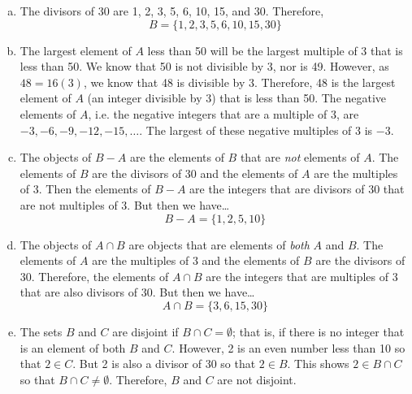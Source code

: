 \documentclass[11pt,letterpaper]{article}
\begin{document}
\sol 
\begin{enumerate}[(a)]
\item The divisors of 30 are 1, 2, 3, 5, 6, 10, 15, and 30. Therefore, 
	\[
	B= \{ 1, 2, 3, 5, 6, 10, 15, 30 \}
	\] \pspace

\item The largest element of $A$ less than 50 will be the largest multiple of 3 that is less than 50. We know that 50 is not divisible by 3, nor is 49. However, as $48= 16(3)$, we know that 48 is divisible by 3. Therefore, 48 is the largest element of $A$ (an integer divisible by 3) that is less than 50. The negative elements of $A$, i.e. the negative integers that are a multiple of 3, are $-3, -6, -9, -12, -15, \ldots$. The largest of these negative multiples of 3 is $-3$. \pspace

\item The objects of $B - A$ are the elements of $B$ that are \textit{not} elements of $A$. The elements of $B$ are the divisors of 30 and the elements of $A$ are the multiples of 3. Then the elements of $B - A$ are the integers that are divisors of 30 that are not multiples of 3. But then we have\dots
	\[
	B - A= \{ 1, 2, 5, 10 \}
	\]


\item The objects of $A \cap B$ are objects that are elements of \textit{both} $A$ and $B$. The elements of $A$ are the multiples of 3 and the elements of $B$ are the divisors of 30. Therefore, the elements of $A \cap B$ are the integers that are multiples of 3 that are also divisors of 30. But then we have\dots
	\[
	A \cap B=  \{ 3, 6, 15, 30 \}
	\] \pspace

\item The sets $B$ and $C$ are disjoint if $B \cap C= \emptyset$; that is, if there is no integer that is an element of both $B$ and $C$. However, 2 is an even number less than 10 so that $2 \in C$. But 2 is also a divisor of 30 so that $2 \in B$. This shows $2 \in B \cap C$ so that $B \cap C \neq \emptyset$. Therefore, $B$ and $C$ are not disjoint. 
\end{enumerate}



\newpage
\end{document}

